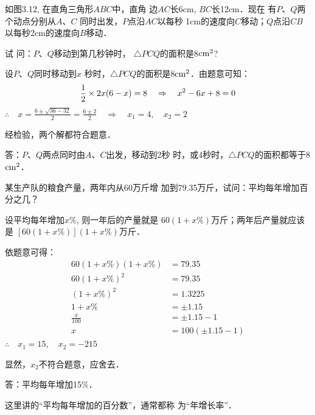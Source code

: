 \begin{example}
    如图3.12, 在直角三角形$ABC$中，直角
    边$AC$长6cm, $BC$长12cm．现在
    有$P$、$Q$两个动点分别从$A$、$C$
    同时出发，$P$点沿$AC$以每秒
    1cm的速度向$C$移动；$Q$点沿$CB$
    以每秒2cm的速度向$B$移动．
    
    试
    问：$P$、$Q$移动到第几秒钟时，
    $\triangle PCQ$的面积是8${\rm cm^2}$?
\end{example}

\begin{figure}[htp]
    \begin{center}
    \end{center}
    \caption{}
\end{figure}



\begin{solution}
设$P$、$Q$同时移动到$x$
秒时，$\triangle PCQ$的面积是8${\rm cm^2}$．由题意可知：
\[\dfrac{1}{2}\times 2x(6-x)=8\quad \Rightarrow\quad x^2-6x+8=0\]
$\therefore\quad x=\frac{6\pm\sqrt{36-32}}{2}=\frac{6\pm 2}{2}\quad\Rightarrow\quad x_1=4,\quad x_2=2$

经检验，两个解都符合题意．

答：$P$、$Q$两点同时由$A$、$C$出发，移动到2秒
时，或4秒时，$\triangle PCQ$的面积都等于8${\rm cm^2}$．
\end{solution}

\begin{example}
某生产队的粮食产量，两年内从60万斤增
加到79.35万斤，试问：平均每年增加百分之几？

\end{example}

\begin{solution}
设平均每年增加$x\%$, 则一年后的产量就是
$60(1+x\%)$万斤；两年后产量就应该是
$[60(1+x\%)](1+x\%)$万斤．

依题意可得：    
\[\begin{split}
    60(1+x\%)(1+x\%)&=79.35\\
60(1+x\%)^2&=79.35\\
(1+x\%)^2&=1.3225\\
1+x\%&=\pm 1.15\\
\frac{x}{100}&=\pm 1.15-1\\
x&=100(\pm 1.15-1)
\end{split}\]
$\therefore\quad x_1=15,\quad x_2=-215$

显然，$x_2$不符合题意，应舍去．

答：平均每年增加15\%．

这里讲的“平均每年增加的百分数”，通常都称
为“年增长率”．
\end{solution}

